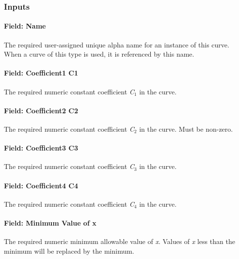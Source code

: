 \subsubsection{Inputs}\label{inputs-13-008}

\paragraph{Field: Name}\label{field-name-13-006}

The required user-assigned unique alpha name for an instance of this curve. When a curve of this type is used, it is referenced by this name.

\paragraph{Field: Coefficient1 C1}\label{field-coefficient1-c1}

The required numeric constant coefficient \emph{C\(_{1}\)} in the curve.

\paragraph{Field: Coefficient2 C2}\label{field-coefficient2-c2}

The required numeric constant coefficient \emph{C\(_{2}\)} in the curve. Must be non-zero.

\paragraph{Field: Coefficient3 C3}\label{field-coefficient3-c3}

The required numeric constant coefficient \emph{C\(_{3}\)} in the curve.

\paragraph{Field: Coefficient4 C4}\label{field-coefficient4-c4}

The required numeric constant coefficient \emph{C\(_{4}\)} in the curve.

\paragraph{Field: Minimum Value of x}\label{field-minimum-value-of-x-12}

The required numeric minimum allowable value of \emph{x}. Values of \emph{x} less than the minimum will be replaced by the minimum.


